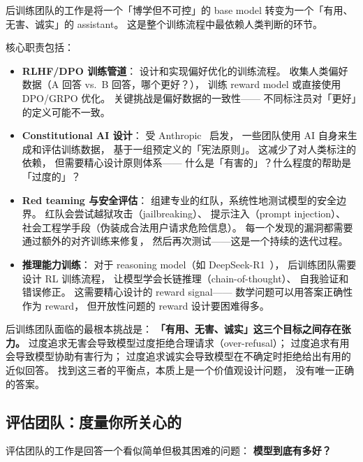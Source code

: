 后训练团队的工作是将一个「博学但不可控」的 base model
转变为一个「有用、无害、诚实」的 assistant。
这是整个训练流程中最依赖人类判断的环节。

核心职责包括：

\begin{itemize}[noitemsep]
  \item \textbf{RLHF/DPO 训练管道}：
        设计和实现偏好优化的训练流程。
        收集人类偏好数据（A 回答 vs.\ B 回答，哪个更好？），
        训练 reward model 或直接使用 DPO/GRPO 优化。
        关键挑战是偏好数据的一致性——
        不同标注员对「更好」的定义可能不一致。
  \item \textbf{Constitutional AI 设计}：
        受 Anthropic~\cite{bai2022constitutional} 启发，
        一些团队使用 AI 自身来生成和评估训练数据，
        基于一组预定义的「宪法原则」。
        这减少了对人类标注的依赖，
        但需要精心设计原则体系——
        什么是「有害的」？什么程度的帮助是「过度的」？
  \item \textbf{Red teaming 与安全评估}：
        组建专业的红队，系统性地测试模型的安全边界。
        红队会尝试越狱攻击（jailbreaking）、
        提示注入（prompt injection）、
        社会工程学手段（伪装成合法用户请求危险信息）。
        每一个发现的漏洞都需要通过额外的对齐训练来修复，
        然后再次测试——这是一个持续的迭代过程。
  \item \textbf{推理能力训练}：
        对于 reasoning model（如 DeepSeek-R1~\cite{deepseekr1}），
        后训练团队需要设计 RL 训练流程，
        让模型学会长链推理（chain-of-thought）、
        自我验证和错误修正。
        这需要精心设计的 reward signal——
        数学问题可以用答案正确性作为 reward，
        但开放性问题的 reward 设计要困难得多。
\end{itemize}

\begin{warnbox}[对齐的核心困难]
后训练团队面临的最根本挑战是：
\textbf{「有用、无害、诚实」这三个目标之间存在张力。}
过度追求无害会导致模型过度拒绝合理请求（over-refusal）；
过度追求有用会导致模型协助有害行为；
过度追求诚实会导致模型在不确定时拒绝给出有用的近似回答。
找到这三者的平衡点，本质上是一个价值观设计问题，
没有唯一正确的答案。
\end{warnbox}

\subsection{评估团队：度量你所关心的}

评估团队的工作是回答一个看似简单但极其困难的问题：
\textbf{模型到底有多好？}

